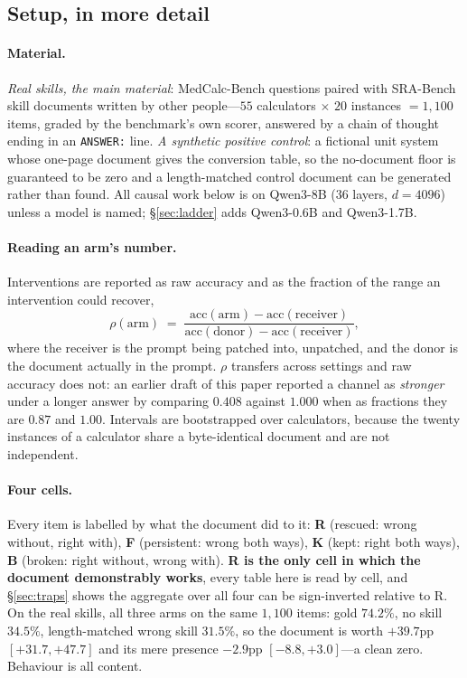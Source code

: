 \documentclass{article}
\begin{document}
\subsection{Setup, in more detail}
\label{app:setup2}

\paragraph{Material.} \emph{Real skills, the main material}: MedCalc-Bench
questions paired with SRA-Bench skill documents written by other people---$55$
calculators $\times$ $20$ instances $=1{,}100$ items, graded by the benchmark's
own scorer, answered by a chain of thought ending in an \texttt{ANSWER:} line.
\emph{A synthetic positive control}: a fictional unit system whose one-page
document gives the conversion table, so the no-document floor is guaranteed to
be zero and a length-matched control document can be generated rather than
found. All causal work below is on Qwen3-8B (36 layers, $d=4096$) unless a model
is named; \S\ref{sec:ladder} adds Qwen3-0.6B and Qwen3-1.7B.

\paragraph{Reading an arm's number.} Interventions are reported as raw accuracy
and as the fraction of the range an intervention could recover,
\begin{equation}
\rho(\text{arm}) \;=\;
\frac{\text{acc}(\text{arm}) - \text{acc}(\text{receiver})}
     {\text{acc}(\text{donor}) - \text{acc}(\text{receiver})},
\end{equation}
where the receiver is the prompt being patched into, unpatched, and the donor is
the document actually in the prompt. $\rho$ transfers across settings and raw
accuracy does not: an earlier draft of this paper reported a channel as
\emph{stronger} under a longer answer by comparing $0.408$ against $1.000$ when
as fractions they are $0.87$ and $1.00$. Intervals are bootstrapped over
calculators, because the twenty instances of a calculator share a
byte-identical document and are not independent.

\paragraph{Four cells.}

Every item is labelled by what the document did to it: \textbf{R} (rescued:
wrong without, right with), \textbf{F} (persistent: wrong both ways), \textbf{K}
(kept: right both ways), \textbf{B} (broken: right without, wrong with).
\textbf{R is the only cell in which the document demonstrably works}, every
table here is read by cell, and \S\ref{sec:traps} shows the aggregate over all
four can be sign-inverted relative to R. On the real skills, all three arms on
the same $1{,}100$ items: gold $74.2\%$, no skill $34.5\%$, length-matched wrong
skill $31.5\%$, so the document is worth $+39.7$pp $[+31.7, +47.7]$ and its mere
presence $-2.9$pp $[-8.8, +3.0]$---a clean zero. Behaviour is all content.
\end{document}
